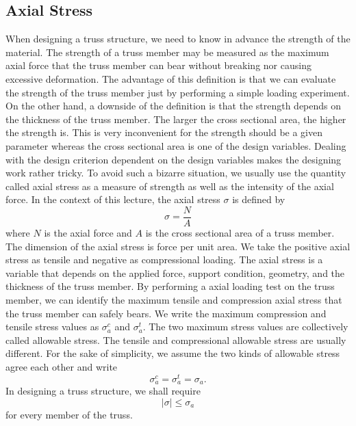 \documentclass[10pt,a4j]{article}
\begin{document}
\subsection{Axial Stress}
When designing a truss structure, we need to know in advance the strength of 
the material. The strength of a truss member may be measured as the maximum axial 
force that the truss member can bear without breaking nor causing excessive deformation. 
The advantage of this definition is that we can evaluate the strength of the truss 
member just by performing a simple loading experiment.
On the other hand, a downside of the definition is that the strength depends on 
the thickness of the truss member. The larger the cross sectional area, the 
higher the strength is. This is very inconvenient for the strength should be a 
given parameter whereas the cross sectional area is one of the design 
variables. Dealing with the design criterion dependent on the design variables 
 makes the designing work rather tricky. 
 To avoid such a bizarre situation, we usually use the quantity called axial 
 stress as a measure of strength as well as the intensity of the axial force.
In the context of this lecture, the axial stress $\sigma$ is defined by
\begin{equation}
	\sigma=\frac{N}{A}
	\label{eqn:def_sigma}
\end{equation}
where $N$ is the axial force and $A$ is the cross sectional area of a truss member. 
The dimension of the axial stress is force per unit area. 
We take the positive axial stress as tensile and negative as compressional loading. 
The axial stress is a variable that depends on the applied force, 
support condition, geometry, and the thickness of the truss member. 
By performing a axial loading test on the truss member, 
we can identify the maximum tensile and compression axial stress 
that the truss member can safely bears. 
We write the maximum compression and tensile stress values as 
$\sigma_{a}^c$ and $\sigma_{a}^t$. 
The two maximum stress values are collectively called allowable stress.
The tensile and compressional allowable stress are usually different. 
For the sake of simplicity, we assume the two kinds of allowable stress agree 
each other and write
\begin{equation}
	\sigma_a^c=\sigma_a^t=\sigma_a.
	\label{eqn:sig_a}
\end{equation}
In designing a truss structure, we shall require 
\begin{equation}
	\left| \sigma \right| \leq \sigma_a
	\label{eqn:sig_a_cond}
\end{equation}
for every member of the truss. 
\end{document}
